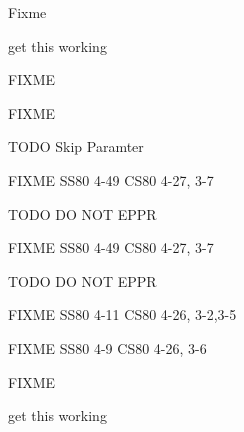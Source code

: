 \begin{DoxyRefList}
Fixme  
\item[\label{todo__todo000025}%
\hypertarget{todo__todo000025}{}%
Global \hyperlink{ss80_8h_af50a313d8234d38511925a0ca5a9a8a3}{S\+S80\+\_\+\+Test} (void)]get this working  
\item[\label{todo__todo000049}%
\hypertarget{todo__todo000049}{}%
Global \hyperlink{ss80_8h_a00d10ca5d1cb70d035927df06e90d36c}{S\+S80\+\_\+\+Transparent\+\_\+\+State} (void)]F\+I\+X\+ME 

F\+I\+X\+ME 

T\+O\+DO Skip Paramter 

F\+I\+X\+ME S\+S80 4-\/49 C\+S80 4-\/27, 3-\/7 

T\+O\+DO DO N\+OT E\+P\+PR 

F\+I\+X\+ME S\+S80 4-\/49 C\+S80 4-\/27, 3-\/7 

T\+O\+DO DO N\+OT E\+P\+PR 

F\+I\+X\+ME S\+S80 4-\/11 C\+S80 4-\/26, 3-\/2,3-\/5 

F\+I\+X\+ME S\+S80 4-\/9 C\+S80 4-\/26, 3-\/6  
\item[\label{todo__todo000062}%
\hypertarget{todo__todo000062}{}%
Global \hyperlink{ss80_8h_ac8a4c5dcd550e896c1e7cec68d2f70e5}{S\+S80\+\_\+\+Universal\+\_\+\+Device\+\_\+\+Clear} (void)]F\+I\+X\+ME  
\item[\label{todo__todo000024}%
\hypertarget{todo__todo000024}{}%
Global \hyperlink{ss80_8c_a239f4cd0f1360dbfd90fa043d1323e67}{TD} \mbox{[}\mbox{]}]get this working 
\end{DoxyRefList}